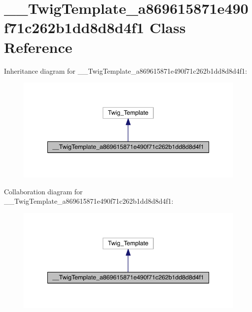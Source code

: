 \hypertarget{class_____twig_template__a869615871e490f71c262b1dd8d8d4f1}{\section{\-\_\-\-\_\-\-Twig\-Template\-\_\-a869615871e490f71c262b1dd8d8d4f1 Class Reference}
\label{class_____twig_template__a869615871e490f71c262b1dd8d8d4f1}
}


Inheritance diagram for \-\_\-\-\_\-\-Twig\-Template\-\_\-a869615871e490f71c262b1dd8d8d4f1\-:
\nopagebreak
\begin{figure}[H]
\begin{center}
\leavevmode
\includegraphics[width=344pt]{class_____twig_template__a869615871e490f71c262b1dd8d8d4f1__inherit__graph}
\end{center}
\end{figure}


Collaboration diagram for \-\_\-\-\_\-\-Twig\-Template\-\_\-a869615871e490f71c262b1dd8d8d4f1\-:
\nopagebreak
\begin{figure}[H]
\begin{center}
\leavevmode
\includegraphics[width=344pt]{class_____twig_template__a869615871e490f71c262b1dd8d8d4f1__coll__graph}
\end{center}
\end{figure}
